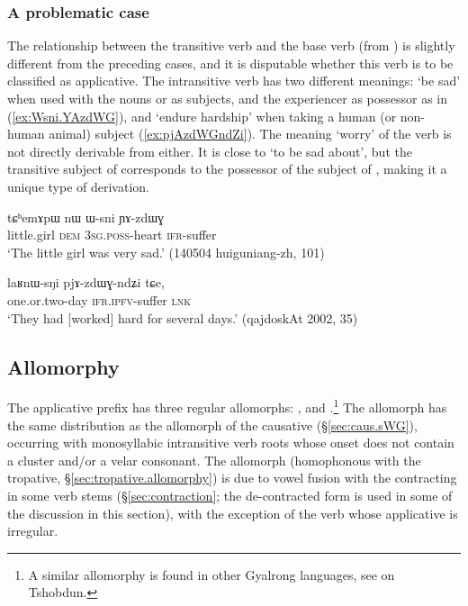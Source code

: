 \subsubsection{A problematic case} \label{sec:nWzdWG}
The relationship between the transitive verb   and the base verb  (from ) is slightly different from the preceding cases, and it is disputable whether this verb is to be classified as applicative. The intransitive verb  has two different meanings: `be sad' when used with the nouns  or  as subjects, and the experiencer as possessor as in (\ref{ex:Wsni.YAzdWG}), and `endure hardship' when taking a human (or non-human animal) subject (\ref{ex:pjAzdWGndZi}). The meaning `worry' of the verb  is not directly derivable from either. It is close to `to be sad about', but the transitive subject of  corresponds to the possessor of the subject of , making it a unique type of derivation.

\begin{exe}
\ex \label{ex:Wsni.YAzdWG}
\gll  tɕʰemɤpɯ nɯ ɯ-sni ɲɤ-zdɯɣ \\
little.girl \textsc{dem} \textsc{3sg}.\textsc{poss}-heart \textsc{ifr}-suffer \\
\glt `The little girl was very sad.' (140504 huiguniang-zh, 101)
\end{exe}

\begin{exe}
\ex \label{ex:pjAzdWGndZi}
\gll  laʁnɯ-sŋi pjɤ-zdɯɣ-ndʑi tɕe, \\
one.or.two-day \textsc{ifr}.\textsc{ipfv}-suffer \textsc{lnk} \\
\glt `They had [worked] hard for several days.' (qajdoskAt 2002, 35)
\end{exe}


\subsection{Allomorphy} \label{sec:allomorphy.applicative}
The applicative prefix has three regular allomorphs: ,  and .\footnote{A similar allomorphy is found in other Gyalrong languages, see \citet{jackson06paisheng} on Tshobdun.} The allomorph  has the same distribution as the  allomorph of the causative (§\ref{sec:caus.sWG}), occurring with monosyllabic intransitive verb roots whose onset does not contain a cluster and/or a velar consonant. The allomorph  (homophonous with the tropative, §\ref{sec:tropative.allomorphy}) is due to vowel fusion with the contracting  in some verb stems (§\ref{sec:contraction}; the de-contracted form  is used in some of the discussion in this section), with the exception of the verb  whose applicative is irregular. 

